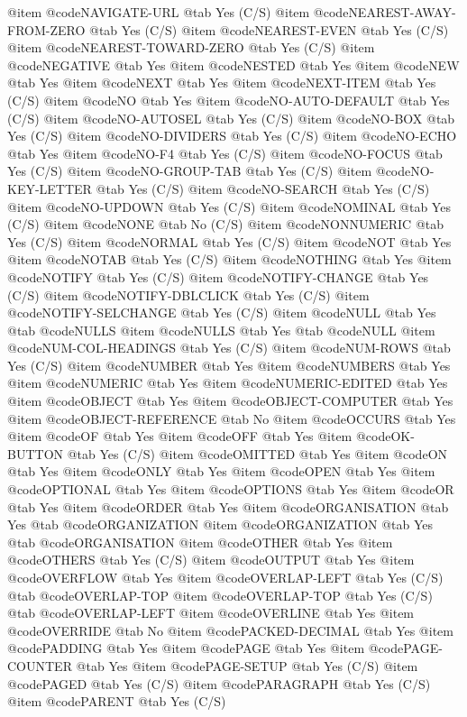 @item @code{NAVIGATE-URL} @tab Yes (C/S)
@item @code{NEAREST-AWAY-FROM-ZERO} @tab Yes (C/S)
@item @code{NEAREST-EVEN} @tab Yes (C/S)
@item @code{NEAREST-TOWARD-ZERO} @tab Yes (C/S)
@item @code{NEGATIVE} @tab Yes
@item @code{NESTED} @tab Yes
@item @code{NEW} @tab Yes
@item @code{NEXT} @tab Yes
@item @code{NEXT-ITEM} @tab Yes (C/S)
@item @code{NO} @tab Yes
@item @code{NO-AUTO-DEFAULT} @tab Yes (C/S)
@item @code{NO-AUTOSEL} @tab Yes (C/S)
@item @code{NO-BOX} @tab Yes (C/S)
@item @code{NO-DIVIDERS} @tab Yes (C/S)
@item @code{NO-ECHO} @tab Yes
@item @code{NO-F4} @tab Yes (C/S)
@item @code{NO-FOCUS} @tab Yes (C/S)
@item @code{NO-GROUP-TAB} @tab Yes (C/S)
@item @code{NO-KEY-LETTER} @tab Yes (C/S)
@item @code{NO-SEARCH} @tab Yes (C/S)
@item @code{NO-UPDOWN} @tab Yes (C/S)
@item @code{NOMINAL} @tab Yes (C/S)
@item @code{NONE} @tab No (C/S)
@item @code{NONNUMERIC} @tab Yes (C/S)
@item @code{NORMAL} @tab Yes (C/S)
@item @code{NOT} @tab Yes
@item @code{NOTAB} @tab Yes (C/S)
@item @code{NOTHING} @tab Yes
@item @code{NOTIFY} @tab Yes (C/S)
@item @code{NOTIFY-CHANGE} @tab Yes (C/S)
@item @code{NOTIFY-DBLCLICK} @tab Yes (C/S)
@item @code{NOTIFY-SELCHANGE} @tab Yes (C/S)
@item @code{NULL} @tab Yes @tab @code{NULLS}
@item @code{NULLS} @tab Yes @tab @code{NULL}
@item @code{NUM-COL-HEADINGS} @tab Yes (C/S)
@item @code{NUM-ROWS} @tab Yes (C/S)
@item @code{NUMBER} @tab Yes
@item @code{NUMBERS} @tab Yes
@item @code{NUMERIC} @tab Yes
@item @code{NUMERIC-EDITED} @tab Yes
@item @code{OBJECT} @tab Yes
@item @code{OBJECT-COMPUTER} @tab Yes
@item @code{OBJECT-REFERENCE} @tab No
@item @code{OCCURS} @tab Yes
@item @code{OF} @tab Yes
@item @code{OFF} @tab Yes
@item @code{OK-BUTTON} @tab Yes (C/S)
@item @code{OMITTED} @tab Yes
@item @code{ON} @tab Yes
@item @code{ONLY} @tab Yes
@item @code{OPEN} @tab Yes
@item @code{OPTIONAL} @tab Yes
@item @code{OPTIONS} @tab Yes
@item @code{OR} @tab Yes
@item @code{ORDER} @tab Yes
@item @code{ORGANISATION} @tab Yes @tab @code{ORGANIZATION}
@item @code{ORGANIZATION} @tab Yes @tab @code{ORGANISATION}
@item @code{OTHER} @tab Yes
@item @code{OTHERS} @tab Yes (C/S)
@item @code{OUTPUT} @tab Yes
@item @code{OVERFLOW} @tab Yes
@item @code{OVERLAP-LEFT} @tab Yes (C/S) @tab @code{OVERLAP-TOP}
@item @code{OVERLAP-TOP} @tab Yes (C/S) @tab @code{OVERLAP-LEFT}
@item @code{OVERLINE} @tab Yes
@item @code{OVERRIDE} @tab No
@item @code{PACKED-DECIMAL} @tab Yes
@item @code{PADDING} @tab Yes
@item @code{PAGE} @tab Yes
@item @code{PAGE-COUNTER} @tab Yes
@item @code{PAGE-SETUP} @tab Yes (C/S)
@item @code{PAGED} @tab Yes (C/S)
@item @code{PARAGRAPH} @tab Yes (C/S)
@item @code{PARENT} @tab Yes (C/S)
